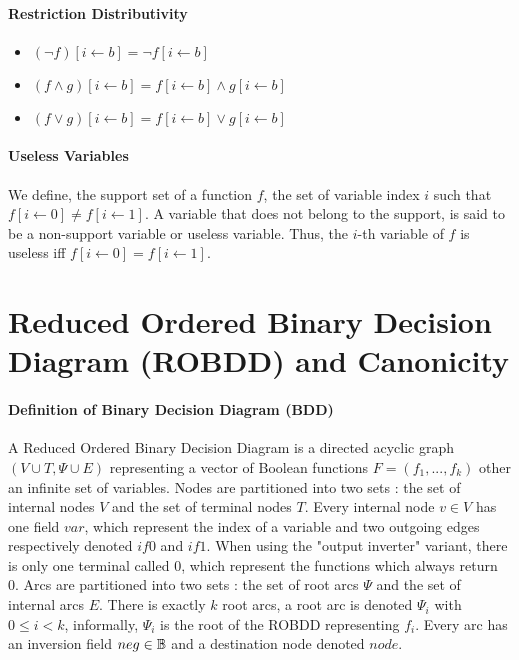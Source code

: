 \documentclass[a4paper,10pt]{article}
\begin{document}
\paragraph{Restriction Distributivity\\}

\begin{itemize}
\item $(\lnot f)[i\leftarrow b] = \lnot f[i\leftarrow b]$
\item $(f\land g)[i\leftarrow b] = f[i\leftarrow b] \land g[i\leftarrow b]$
\item $(f\lor g)[i\leftarrow b] = f[i\leftarrow b] \lor g[i\leftarrow b]$
\end{itemize}

\paragraph{Useless Variables\\}

We define, the support set of a function $f$, the set of variable index $i$ such that $f[i\leftarrow 0] \neq f[i\leftarrow 1]$.
A variable that does not belong to the support, is said to be a non-support variable or useless variable.
Thus, the $i$-th variable of $f$ is useless iff $f[i\leftarrow 0] = f[i\leftarrow 1]$.

\section{Reduced Ordered Binary Decision Diagram (ROBDD) and Canonicity}

\paragraph{Definition of Binary Decision Diagram (BDD)\\}

A Reduced Ordered Binary Decision Diagram is a directed acyclic graph $(V\cup T, \Psi \cup E)$ representing a vector of Boolean functions $F=(f_1, ..., f_k)$ other an infinite set of variables.
Nodes are partitioned into two sets : the set of internal nodes $V$ and the set of terminal nodes $T$.
Every internal node $v\in V$ has one field $var$, which represent the index of a variable and two outgoing edges respectively denoted $if0$ and $if1$.
When using the "output inverter" variant, there is only one terminal called 0, which represent the functions which always return 0.
Arcs are partitioned into two sets : the set of root arcs $\Psi$ and the set of internal arcs $E$.
There is exactly $k$ root arcs, a root arc is denoted $\Psi_i$ with $0\leq i < k$, informally, $\Psi_i$ is the root of the ROBDD representing $f_i$.
Every arc has an inversion field $neg \in \mathbb{B}$ and a destination node denoted $node$.
\end{document}
